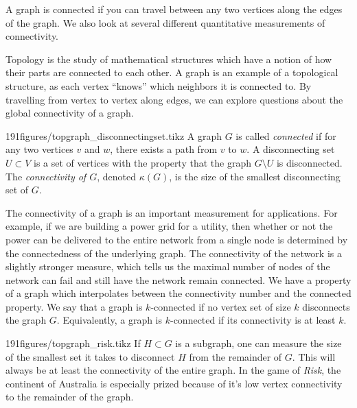 \begin{elevator}[Connectivity]
	A graph is connected if you can travel between any two vertices along the edges of the graph. We also look at several different quantitative measurements of connectivity.
\end{elevator}
\label{sec:graph:connectivity}
Topology is the study of mathematical structures which have a notion of how their parts are connected to each other.
A graph is an example of a topological structure, as each vertex ``knows'' which neighbors it is connected to. 
By travelling from vertex to vertex along edges, we can explore questions about the global connectivity of a graph.

\begin{definitionfigureenv}{191figures/topgraph_disconnectingset.tikz}
	A graph $G$ is called \emph{connected} if for any two vertices $v$ and $w$,  there exists a path from $v$ to $w$. 
	A disconnecting set $U\subset V$ is a set of vertices with the property that the graph $G\setminus U$ is disconnected.
	The \emph{connectivity of $G$}, denoted $\kappa(G)$, is the size of the smallest disconnecting set of $G$.  
\end{definitionfigureenv}

The connectivity of a graph is an important measurement for applications.
For example, if we are building a power grid for a utility, then whether or not the power can be delivered to the entire network from a single node is determined by the connectedness of the underlying graph. 
The connectivity of the network is a slightly stronger measure, which tells us the maximal number of nodes of the network can fail and still have the network remain connected.
We have a property of a graph which interpolates between the connectivity number and the connected property. We say that a graph is $k$-connected if no vertex set of size $k$ disconnects the graph $G$.
Equivalently, a graph is $k$-connected if its connectivity is at least $k$. 

%	


\begin{examplefigureenv}{191figures/topgraph_risk.tikz}
	If $H\subset G$ is a subgraph, one can measure the size of the smallest set it takes to disconnect $H$ from the remainder of $G$.
	This will always be at least the connectivity of the entire graph.
	In the game of \emph{Risk}, the continent of Australia is especially prized because of it's low vertex connectivity to the remainder of the graph. 
\end{examplefigureenv}

